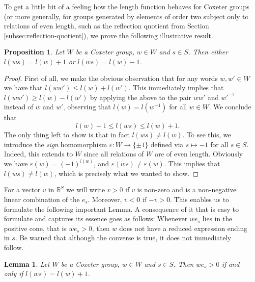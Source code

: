 \documentclass{article}
\newtheorem{lemma}[theorem]{Lemma}
\newtheorem{proposition}[theorem]{Proposition}
\theoremstyle{definition}
\begin{document}
To get a little bit of a feeling how the length function behaves for Coxeter groups (or more generally, for groups generated by elements of order two subject only to relations of even length, such as the reflection quotient from Section \ref{subsec:reflection-quotient}), we prove the following illustrative result.

\begin{proposition}
Let $W$ be a Coxeter group, $w \in W$ and $s \in S$. Then either $l(ws) = l(w) + 1$ or $l(ws) = l(w) - 1$.
\end{proposition}

\begin{proof}
First of all, we make the obvious observation that for any words 
$w, w' \in W$ we have that $l(ww') \leq l(w) + l(w')$. This immediately implies that $l(ww') \geq l(w) - l(w')$ by applying the above to the pair $ww'$ and $w'^{-1}$ instead of $w$ and $w'$, observing that $l(w) = l(w^{-1})$ for all $w \in W$. We conclude that
$$l(w) - 1 \leq l(ws) \leq l(w) + 1.$$
The only thing left to show is that in fact $l(ws) \neq l(w)$. To see this, we introduce the \textit{sign} homomorphism $\varepsilon: W \rightarrow \{\pm 1\}$ defined via $s \mapsto -1$ for all $s \in S$. Indeed, this extends to $W$ since all relations of $W$ are of even length. Obviously we have $\varepsilon(w) = (-1)^{l(w)}$, and $\varepsilon(ws) \neq \varepsilon(w)$. This implies that $l(ws) \neq l(w)$, which is precisely what we wanted to show.
\end{proof}

For a vector $v$ in $\mathbb{R}^S$ we will write $v > 0$ if $v$ is non-zero and is a non-negative linear combination of the $e_s$. Moreover, $v < 0$ if $-v>0$. This enables us to formulate the following important Lemma. A consequence of it that is easy to formulate and captures its essence goes as follows: Whenever $we_s$ lies in the positive cone, that is $w e_s > 0$, then $w$ does not have a reduced expression ending in $s$. Be warned that although the converse is true, it does not immediately follow.

\begin{lemma}\label{lem:humphreys5.4}
Let $W$ be a Coxeter group, $w \in W$ and $s \in S$. Then $we_s > 0$ if and only if $l(ws) = l(w) + 1$.
\end{lemma}
\end{document}
